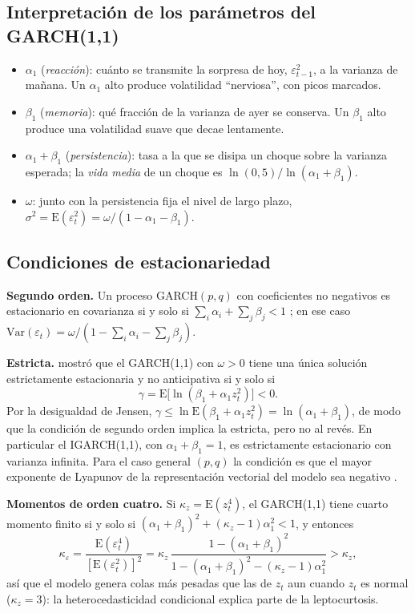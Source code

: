 \documentclass[legalpaper,11pt]{article}
\newcommand{\E}{\mathrm{E}}
\newcommand{\Var}{\mathrm{Var}}
\begin{document}
\subsection{Interpretación de los parámetros del GARCH(1,1)}
\begin{itemize}
  \item $\alpha_1$ (\emph{reacción}): cuánto se transmite la sorpresa de hoy,
  $\varepsilon_{t-1}^2$, a la varianza de mañana. Un $\alpha_1$ alto produce volatilidad
  ``nerviosa'', con picos marcados.
  \item $\beta_1$ (\emph{memoria}): qué fracción de la varianza de ayer se conserva.
  Un $\beta_1$ alto produce una volatilidad suave que decae lentamente.
  \item $\alpha_1+\beta_1$ (\emph{persistencia}): tasa a la que se disipa un choque sobre la
  varianza esperada; la \emph{vida media} de un choque es $\ln(0{,}5)/\ln(\alpha_1+\beta_1)$.
  \item $\omega$: junto con la persistencia fija el nivel de largo plazo,
  $\sigma^2=\E(\varepsilon_t^2)=\omega/(1-\alpha_1-\beta_1)$.
\end{itemize}

\subsection{Condiciones de estacionariedad}\label{sec:estac}
\textbf{Segundo orden.} Un proceso GARCH$(p,q)$ con coeficientes no negativos es
estacionario en covarianza si y solo si $\sum_i\alpha_i+\sum_j\beta_j<1$
\citep{bollerslev1986}; en ese caso $\Var(\varepsilon_t)=\omega/(1-\sum_i\alpha_i-\sum_j\beta_j)$.

\textbf{Estricta.} \citet{nelson1990} mostró que el GARCH(1,1) con $\omega>0$ tiene una única
solución estrictamente estacionaria y no anticipativa si y solo si
\begin{equation}\label{eq:estricta}
\gamma=\E\big[\ln(\beta_1+\alpha_1 z_t^2)\big]<0 .
\end{equation}
Por la desigualdad de Jensen, $\gamma\le\ln\E(\beta_1+\alpha_1z_t^2)=\ln(\alpha_1+\beta_1)$, de
modo que la condición de segundo orden implica la estricta, pero no al revés. En particular el
IGARCH(1,1), con $\alpha_1+\beta_1=1$, es estrictamente estacionario con varianza infinita. Para
el caso general $(p,q)$ la condición es que el mayor exponente de Lyapunov de la representación
vectorial del modelo sea negativo \citep{bougerol1992,francq2010}.

\textbf{Momentos de orden cuatro.} Si $\kappa_z=\E(z_t^4)$, el GARCH(1,1) tiene cuarto momento
finito si y solo si $(\alpha_1+\beta_1)^2+(\kappa_z-1)\alpha_1^2<1$, y entonces
\begin{equation}\label{eq:curtosis}
\kappa_\varepsilon=\frac{\E(\varepsilon_t^4)}{[\E(\varepsilon_t^2)]^2}
=\kappa_z\,\frac{1-(\alpha_1+\beta_1)^2}{1-(\alpha_1+\beta_1)^2-(\kappa_z-1)\alpha_1^2}>\kappa_z ,
\end{equation}
así que el modelo genera colas más pesadas que las de $z_t$ aun cuando $z_t$ es normal
($\kappa_z=3$): la heterocedasticidad condicional explica parte de la leptocurtosis.
\end{document}

